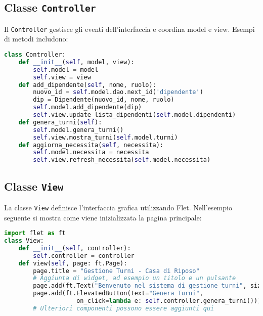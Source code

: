 \documentclass[a4paper,12pt]{report}
\begin{document}
\subsection{Classe \texttt{Controller}}
Il \texttt{Controller} gestisce gli eventi dell'interfaccia e coordina model e view. Esempi di metodi includono:
\begin{lstlisting}[language=Python]
class Controller:
    def __init__(self, model, view):
        self.model = model
        self.view = view
    def add_dipendente(self, nome, ruolo):
        nuovo_id = self.model.dao.next_id('dipendente')
        dip = Dipendente(nuovo_id, nome, ruolo)
        self.model.add_dipendente(dip)
        self.view.update_lista_dipendenti(self.model.dipendenti)
    def genera_turni(self):
        self.model.genera_turni()
        self.view.mostra_turni(self.model.turni)
    def aggiorna_necessita(self, necessita):
        self.model.necessita = necessita
        self.view.refresh_necessita(self.model.necessita)
\end{lstlisting}

\subsection{Classe \texttt{View}}
La classe \texttt{View} definisce l'interfaccia grafica utilizzando Flet. Nell'esempio seguente si mostra come viene inizializzata la pagina principale:
\begin{lstlisting}[language=Python]
import flet as ft
class View:
    def __init__(self, controller):
        self.controller = controller
    def view(self, page: ft.Page):
        page.title = "Gestione Turni - Casa di Riposo"
        # Aggiunta di widget, ad esempio un titolo e un pulsante
        page.add(ft.Text("Benvenuto nel sistema di gestione turni", size=24))
        page.add(ft.ElevatedButton(text="Genera Turni",
                    on_click=lambda e: self.controller.genera_turni()))
        # Ulteriori componenti possono essere aggiunti qui
\end{lstlisting}
\end{document}
